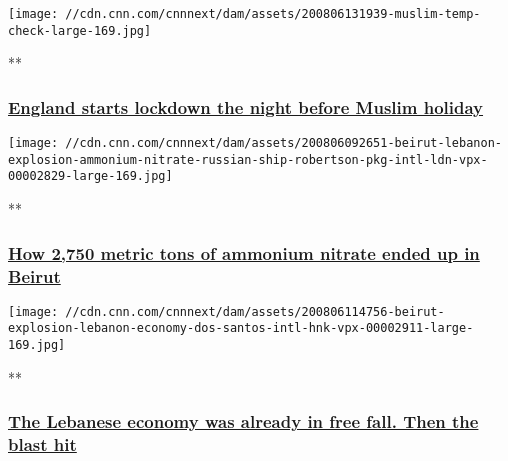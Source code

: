 \href{/videos/world/2020/08/06/england-lockdown-on-eid-eve-muslims-veselinovic-vpx.cnn/video/playlists/around-the-world/}{}

\texttt{[image: //cdn.cnn.com/cnnnext/dam/assets/200806131939-muslim-temp-check-large-169.jpg]}

**

\hypertarget{england-starts-lockdown-the-night-before-muslim-holiday}{%
\subsubsection{\texorpdfstring{\href{/videos/world/2020/08/06/england-lockdown-on-eid-eve-muslims-veselinovic-vpx.cnn/video/playlists/around-the-world/}{England
starts lockdown the night before Muslim
holiday}}{England starts lockdown the night before Muslim holiday}}\label{england-starts-lockdown-the-night-before-muslim-holiday}}

\href{/videos/world/2020/08/06/beirut-lebanon-explosion-ammonium-nitrate-russian-ship-robertson-pkg-intl-ldn-vpx.cnn/video/playlists/around-the-world/}{}

\texttt{[image: //cdn.cnn.com/cnnnext/dam/assets/200806092651-beirut-lebanon-explosion-ammonium-nitrate-russian-ship-robertson-pkg-intl-ldn-vpx-00002829-large-169.jpg]}

**

\hypertarget{how-2750-metric-tons-of-ammonium-nitrate-ended-up-in-beirut}{%
\subsubsection{\texorpdfstring{\href{/videos/world/2020/08/06/beirut-lebanon-explosion-ammonium-nitrate-russian-ship-robertson-pkg-intl-ldn-vpx.cnn/video/playlists/around-the-world/}{How
2,750 metric tons of ammonium nitrate ended up in
Beirut}}{How 2,750 metric tons of ammonium nitrate ended up in Beirut}}\label{how-2750-metric-tons-of-ammonium-nitrate-ended-up-in-beirut}}

\href{/videos/business/2020/08/06/beirut-explosion-lebanon-economy-dos-santos-intl-hnk-vpx.cnn/video/playlists/around-the-world/}{}

\texttt{[image: //cdn.cnn.com/cnnnext/dam/assets/200806114756-beirut-explosion-lebanon-economy-dos-santos-intl-hnk-vpx-00002911-large-169.jpg]}

**

\hypertarget{the-lebanese-economy-was-already-in-free-fall-then-the-blast-hit}{%
\subsubsection{\texorpdfstring{\href{/videos/business/2020/08/06/beirut-explosion-lebanon-economy-dos-santos-intl-hnk-vpx.cnn/video/playlists/around-the-world/}{The
Lebanese economy was already in free fall. Then the blast
hit}}{The Lebanese economy was already in free fall. Then the blast hit}}\label{the-lebanese-economy-was-already-in-free-fall-then-the-blast-hit}}

